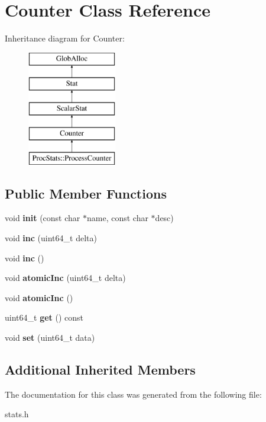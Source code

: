 \hypertarget{classCounter}{\section{Counter Class Reference}
\label{classCounter}
}
Inheritance diagram for Counter\-:\begin{figure}[H]
\begin{center}
\leavevmode
\includegraphics[height=5.000000cm]{classCounter}
\end{center}
\end{figure}
\subsection*{Public Member Functions}
\begin{DoxyCompactItemize}
\item 
\hypertarget{classCounter_af4d8fe24c5d69c0a90053952947a0784}{void {\bfseries init} (const char $\ast$name, const char $\ast$desc)}\label{classCounter_af4d8fe24c5d69c0a90053952947a0784}

\item 
\hypertarget{classCounter_a3d22d44790be17cb3819593dbdd61982}{void {\bfseries inc} (uint64\-\_\-t delta)}\label{classCounter_a3d22d44790be17cb3819593dbdd61982}

\item 
\hypertarget{classCounter_a936f247406df26f76e06aed14fab9713}{void {\bfseries inc} ()}\label{classCounter_a936f247406df26f76e06aed14fab9713}

\item 
\hypertarget{classCounter_ac5e80a29c4063ab0faef1c25d31f48ed}{void {\bfseries atomic\-Inc} (uint64\-\_\-t delta)}\label{classCounter_ac5e80a29c4063ab0faef1c25d31f48ed}

\item 
\hypertarget{classCounter_a937c25ffb0c2049d293cb480ce5aa155}{void {\bfseries atomic\-Inc} ()}\label{classCounter_a937c25ffb0c2049d293cb480ce5aa155}

\item 
\hypertarget{classCounter_a7af39c45db59374d9fb96cdebae210bc}{uint64\-\_\-t {\bfseries get} () const }\label{classCounter_a7af39c45db59374d9fb96cdebae210bc}

\item 
\hypertarget{classCounter_afeff3d9b8fa53c0bd7ea8b36363a478a}{void {\bfseries set} (uint64\-\_\-t data)}\label{classCounter_afeff3d9b8fa53c0bd7ea8b36363a478a}

\end{DoxyCompactItemize}
\subsection*{Additional Inherited Members}


The documentation for this class was generated from the following file\-:\begin{DoxyCompactItemize}
\item 
stats.\-h\end{DoxyCompactItemize}
